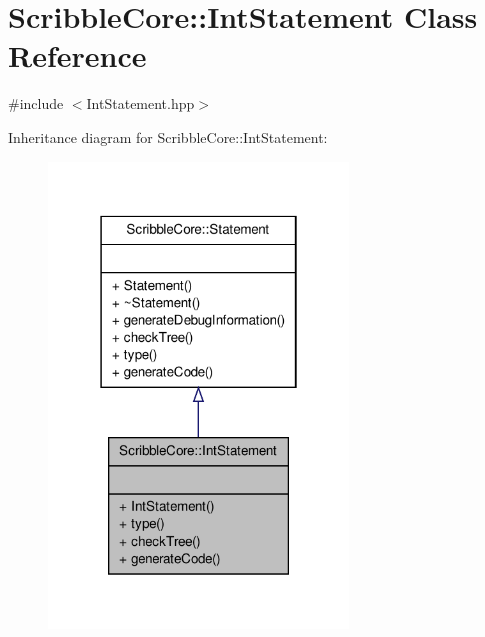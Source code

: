\hypertarget{class_scribble_core_1_1_int_statement}{\section{Scribble\-Core\-:\-:Int\-Statement Class Reference}
\label{class_scribble_core_1_1_int_statement}
}


{\ttfamily \#include $<$Int\-Statement.\-hpp$>$}



Inheritance diagram for Scribble\-Core\-:\-:Int\-Statement\-:
\nopagebreak
\begin{figure}[H]
\begin{center}
\leavevmode
\includegraphics[width=226pt]{class_scribble_core_1_1_int_statement__inherit__graph}
\end{center}
\end{figure}


